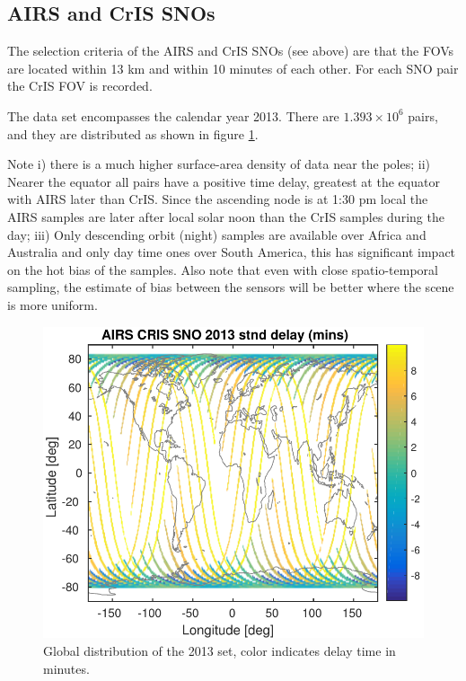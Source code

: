 \documentclass[11pt]{article}
\begin{document}
\subsection{AIRS and CrIS SNOs}
\label{sec:orgheadline9}

The selection criteria of the AIRS and CrIS SNOs (see above) are that the FOVs are located
within 13 km and within 10 minutes of each other. For each SNO pair the CrIS FOV is recorded. 

The data set encompasses the calendar year 2013. There are $1.393\times 10^{6}$ pairs, and they are distributed as shown in figure \ref{fig:Y1}.

Note i) there is a much higher surface-area density of data near the poles; 
ii) Nearer the equator all pairs have a positive time delay, greatest at the equator with AIRS later than CrIS. Since the ascending node is at 1:30 pm local the 
AIRS samples are later after local solar noon than the CrIS samples during the day; 
iii) Only descending orbit (night) samples are available over Africa and Australia and only day time ones over South America, this has significant impact on the hot bias of the samples. Also note that even with close spatio-temporal sampling, the estimate of bias between the sensors will be better where the scene is more uniform.

\begin{figure}[htb]
\centering
\includegraphics[width=.6\linewidth]{./figs/2013_AirsCris_jplStnd_mapDelay.pdf}
\caption{\label{fig:orgparagraph10}
  Global distribution of the 2013 set, color indicates delay time in minutes.}
\label{fig:Y1}
\end{figure}
\end{document}
